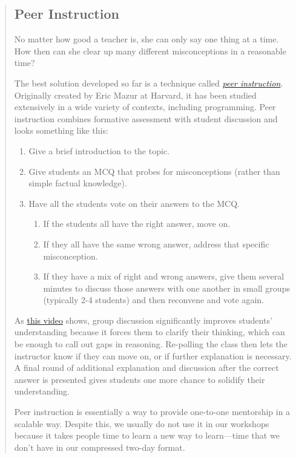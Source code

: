 \begin{quotation}   %
\subsection*{Peer Instruction}

No matter how good a teacher is,
she can only say one thing at a time.
How then can she clear up many different misconceptions
in a reasonable time?

The best solution developed so far is a technique called
\emph{\href{https://en.wikipedia.org/wiki/Peer\_instruction}{peer instruction}}.
Originally created by Eric Mazur at Harvard,
it has been studied extensively in a wide variety of contexts, including programming.
Peer instruction combines formative assessment with student discussion and looks
something like this:

\begin{enumerate}
\item Give a brief introduction to the topic.
\item Give students an MCQ that probes for misconceptions
(rather than simple factual knowledge).
\item Have all the students vote on their answers to the MCQ.


\begin{enumerate}
\item If the students all have the right answer, move on.
\item If they all have the same wrong answer,
address that specific misconception.
\item If they have a mix of right and wrong answers,
give them several minutes to discuss those answers with one another
in small groups (typically 2-4 students)
   and then reconvene and vote again.
\end{enumerate}
\end{enumerate}

As \href{https://www.youtube.com/watch?t=1\&v=2LbuoxAy56o}{this video} shows,
group discussion significantly improves students' understanding
because it forces them to clarify their thinking,
which can be enough to call out gaps in reasoning.
Re-polling the class then lets the instructor know if they can move on,
or if further explanation is necessary.
A final round of additional explanation and discussion after the correct answer is presented
gives students one more chance to solidify their understanding.

Peer instruction is essentially a way to provide one-to-one mentorship in a scalable way.
Despite this,
we usually do not use it in our workshops because
it takes people time to learn a new way to learn---time
that we don't have in our compressed two-day format.
\end{quotation}   %

